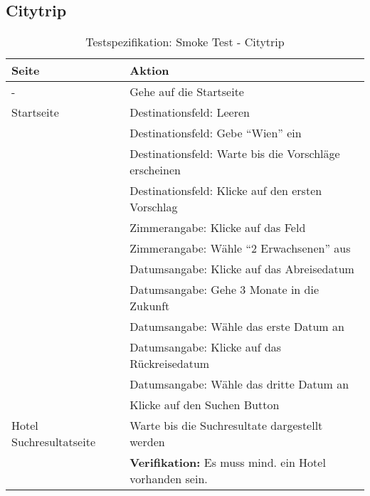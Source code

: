 \subsection{Citytrip}
\begin{table}[H] 
	\caption{Testspezifikation: Smoke Test - Citytrip}
	\centering
		
	\begin{tabularx}{0.9\textwidth}{ | l | X | } 
		\hline 
		\textbf{Seite} & \textbf{Aktion} \\ \hline 
		\multirow{1}{*}{-} & Gehe auf die Startseite \\ \hline
		\multirow{1}{*}{Startseite} & Destinationsfeld: Leeren \\ \cline{2-2}
		& Destinationsfeld: Gebe "`Wien"' ein \\ \cline{2-2}
		& Destinationsfeld: Warte bis die Vorschläge erscheinen \\ \cline{2-2}
		& Destinationsfeld: Klicke auf den ersten Vorschlag \\ \cline{2-2}
		& Zimmerangabe: Klicke auf das Feld \\ \cline{2-2}
		& Zimmerangabe: Wähle "`2 Erwachsenen"' aus \\ \cline{2-2}
		& Datumsangabe: Klicke auf das Abreisedatum \\ \cline{2-2}
		& Datumsangabe: Gehe 3 Monate in die Zukunft \\ \cline{2-2}
		& Datumsangabe: Wähle das erste Datum an \\ \cline{2-2}
		& Datumsangabe: Klicke auf das Rückreisedatum \\ \cline{2-2}
		& Datumsangabe: Wähle das dritte Datum an \\ \cline{2-2}
		& Klicke auf den Suchen Button \\ \hline
		
		\multirow{1}{*}{Hotel Suchresultatseite} & Warte bis die Suchresultate dargestellt werden \\ \cline{2-2}
		& \textbf{Verifikation:} Es muss mind. ein Hotel vorhanden sein. \\ \hline
	\end{tabularx} 
\end{table}

